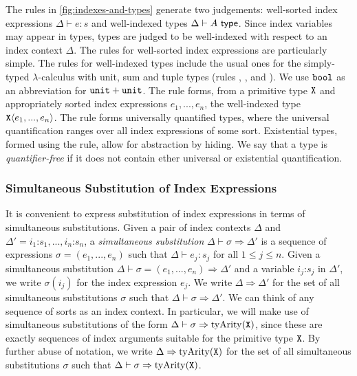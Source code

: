 The rules in \autoref{fig:indexes-and-types}
generate two judgements: well-sorted index expressions $\Delta \vdash
e : s$ and well-indexed types $\Delta \vdash A \textup{\textsf{ type}}$. Since index
variables may appear in types, types are judged to be well-indexed
with respect to an index context $\Delta$. The rules for well-sorted
index expressions are particularly simple. %
The rules for well-indexed types include the usual ones
for
the simply-typed $\lambda$-calculus with unit, sum and tuple types
(rules , ,  and
). 
We use $\textup{\texttt{bool}}$ as an abbreviation for $\textup{\texttt{unit}} + \textup{\texttt{unit}}$.
The rule  %
forms, from a primitive type $\textup{\texttt{X}}$ and appropriately sorted
index expressions $e_1,...,e_n$, the well-indexed type
$\textup{\texttt{X}}\langle e_1,...,e_n \rangle$. The rule  
forms universally quantified types, where the universal
quantification ranges over all index expressions of some
sort. Existential types, %
formed using the  rule,
allow for abstraction by hiding. %
We say that a type is \emph{quantifier-free} if it does not contain
ether universal or existential quantification.

\subsubsection{Simultaneous Substitution of Index Expressions}
\label{sec:simultaneous-substitution}

It %
is convenient to express substitution of index
expressions %
in terms of simultaneous substitutions.
Given a pair of index contexts $\Delta$ and $\Delta' = i_1 \mathord:
s_1, ..., i_n \mathord: s_n$, a \emph{simultaneous substitution}
$\Delta \vdash \sigma \Rightarrow \Delta'$ is a sequence of
expressions $\sigma = (e_1,...,e_n)$ such that $\Delta \vdash e_j :
s_j$ for all $1 \leq j \leq n$. Given a simultaneous substitution
$\Delta \vdash \sigma = (e_1,...,e_n) \Rightarrow \Delta'$ and a
variable $i_j \mathord: s_j$ in $\Delta'$, we write $\sigma(i_j)$ for
the index expression $e_j$. We write $\Delta \Rightarrow \Delta'$ for
the set of all simultaneous substitutions $\sigma$ such that $\Delta
\vdash \sigma \Rightarrow \Delta'$.
%
We can think of any sequence of sorts as an index
context. In particular, we will make use of simultaneous substitutions
of the form $\Delta \vdash \sigma \Rightarrow
\mathrm{tyArity}(\textup{\texttt{X}})$, since these are exactly sequences of
index arguments suitable for the primitive type $\textup{\texttt{X}}$. By
further abuse of notation, we write $\Delta \Rightarrow
\mathrm{tyArity}(\textup{\texttt{X}})$ for the set of all simultaneous
substitutions $\sigma$ such that $\Delta \vdash \sigma \Rightarrow
\mathrm{tyArity}(\textup{\texttt{X}})$.

